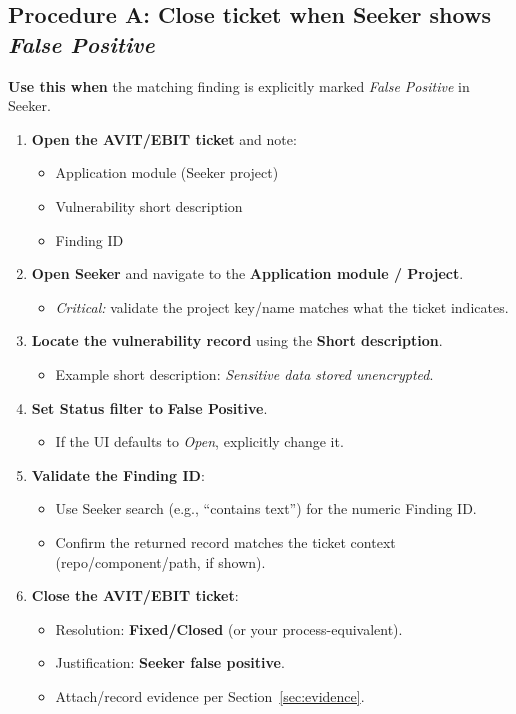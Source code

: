 \documentclass[11pt]{article}
\begin{document}
\subsection{Procedure A: Close ticket when Seeker shows \textit{False Positive}}
\textbf{Use this when} the matching finding is explicitly marked \textit{False Positive} in Seeker.

\begin{enumerate}[leftmargin=*]
  \item \textbf{Open the AVIT/EBIT ticket} and note:
  \begin{itemize}[leftmargin=*]
    \item Application module (Seeker project)
    \item Vulnerability short description
    \item Finding ID
  \end{itemize}

  \item \textbf{Open Seeker} and navigate to the \textbf{Application module / Project}.
  \begin{itemize}[leftmargin=*]
    \item \emph{Critical:} validate the project key/name matches what the ticket indicates.
  \end{itemize}

  \item \textbf{Locate the vulnerability record} using the \textbf{Short description}.
  \begin{itemize}[leftmargin=*]
    \item Example short description: \textit{Sensitive data stored unencrypted}.
  \end{itemize}

  \item \textbf{Set Status filter to} \textbf{False Positive}.
  \begin{itemize}[leftmargin=*]
    \item If the UI defaults to \textit{Open}, explicitly change it.
  \end{itemize}

  \item \textbf{Validate the Finding ID}:
  \begin{itemize}[leftmargin=*]
    \item Use Seeker search (e.g., ``contains text'') for the numeric Finding ID.
    \item Confirm the returned record matches the ticket context (repo/component/path, if shown).
  \end{itemize}

  \item \textbf{Close the AVIT/EBIT ticket}:
  \begin{itemize}[leftmargin=*]
    \item Resolution: \textbf{Fixed/Closed} (or your process-equivalent).
    \item Justification: \textbf{Seeker false positive}.
    \item Attach/record evidence per Section~\ref{sec:evidence}.
  \end{itemize}
\end{enumerate}
\end{document}
